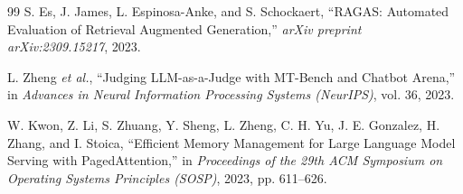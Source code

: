 \documentclass[12pt,a4paper]{report}
\begin{document}
\begin{thebibliography}{99}
S. Es, J. James, L. Espinosa-Anke, and S. Schockaert, ``RAGAS: Automated Evaluation of Retrieval Augmented Generation,'' \textit{arXiv preprint arXiv:2309.15217}, 2023.

L. Zheng \textit{et al.}, ``Judging LLM-as-a-Judge with MT-Bench and Chatbot Arena,'' in \textit{Advances in Neural Information Processing Systems (NeurIPS)}, vol. 36, 2023.

W. Kwon, Z. Li, S. Zhuang, Y. Sheng, L. Zheng, C. H. Yu, J. E. Gonzalez, H. Zhang, and I. Stoica, ``Efficient Memory Management for Large Language Model Serving with PagedAttention,'' in \textit{Proceedings of the 29th ACM Symposium on Operating Systems Principles (SOSP)}, 2023, pp. 611--626.
\end{thebibliography}
\end{document}
